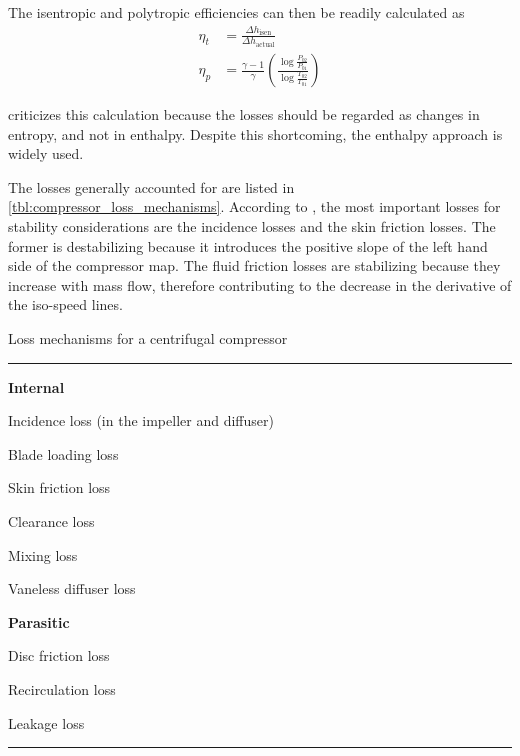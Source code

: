 \documentclass[tcc]{subfiles}
\begin{document}
The isentropic and polytropic efficiencies can then be readily calculated as
\begin{align}
    \eta_t &= \frac{\Delta h_{\text{isen}}}{\Delta h_{\text{actual}}}\\
    \eta_p &= \frac{\gamma-1}{\gamma} \left(\frac{\log\frac{P_{02}}{P_{01}}}
                                                 {\log\frac{T_{02}}{T_{01}}}
                                     \right)
\end{align}

\textcite{Aungier1995} criticizes this calculation because the losses should be regarded as changes in entropy, and not in enthalpy. Despite this shortcoming, the enthalpy approach is widely used.

The losses generally accounted for are listed in \cref{tbl:compressor_loss_mechanisms}. According to \textcite{Gravdahl2004,Gravdahl1999,Ferguson1963,Watson1982}, the most important losses for stability considerations are the incidence losses and the skin friction losses. The former is destabilizing because it introduces the positive slope of the left hand side of the compressor map. The fluid friction losses are stabilizing because they increase with mass flow, therefore contributing to the decrease in the derivative of the iso-speed lines.
\begin{table}
\caption{Loss mechanisms for a centrifugal compressor}
\label{tbl:compressor_loss_mechanisms}
\hrule
\begin{multicols}{2}
\begin{compactitem}
    \item[] \textbf{Internal}
    \item Incidence loss (in the impeller and diffuser)
    \item Blade loading loss
    \item Skin friction loss
    \item Clearance loss
    \item Mixing loss
    \item Vaneless diffuser loss
    \columnbreak
    \item[] \textbf{Parasitic}
    \item Disc friction loss
    \item Recirculation loss
    \item Leakage loss
\end{compactitem}
\end{multicols}
\hrule
{}
\end{table}
\end{document}
